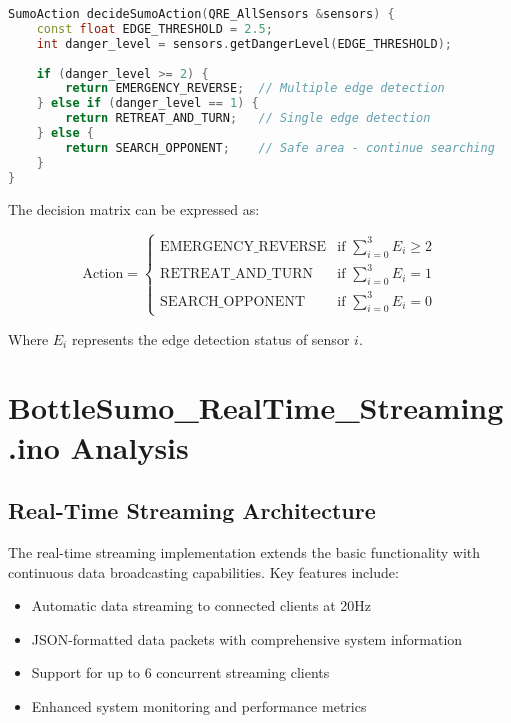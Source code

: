 \documentclass[12pt,a4paper]{article}
\begin{document}
\begin{lstlisting}[language=C++, caption=Sumo Action Decision Logic]
SumoAction decideSumoAction(QRE_AllSensors &sensors) {
    const float EDGE_THRESHOLD = 2.5;
    int danger_level = sensors.getDangerLevel(EDGE_THRESHOLD);
    
    if (danger_level >= 2) {
        return EMERGENCY_REVERSE;  // Multiple edge detection
    } else if (danger_level == 1) {
        return RETREAT_AND_TURN;   // Single edge detection
    } else {
        return SEARCH_OPPONENT;    // Safe area - continue searching
    }
}
\end{lstlisting}

The decision matrix can be expressed as:

\begin{equation}
\text{Action} = \begin{cases}
\text{EMERGENCY\_REVERSE} & \text{if } \sum_{i=0}^{3} E_i \geq 2 \\
\text{RETREAT\_AND\_TURN} & \text{if } \sum_{i=0}^{3} E_i = 1 \\
\text{SEARCH\_OPPONENT} & \text{if } \sum_{i=0}^{3} E_i = 0
\end{cases}
\end{equation}

Where $E_i$ represents the edge detection status of sensor $i$.

\section{BottleSumo\_RealTime\_Streaming.ino Analysis}

\subsection{Real-Time Streaming Architecture}

The real-time streaming implementation extends the basic functionality with continuous data broadcasting capabilities. Key features include:

\begin{itemize}
    \item Automatic data streaming to connected clients at 20Hz
    \item JSON-formatted data packets with comprehensive system information
    \item Support for up to 6 concurrent streaming clients
    \item Enhanced system monitoring and performance metrics
\end{itemize}
\end{document}
